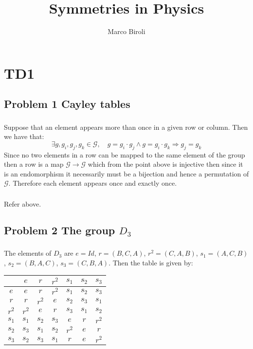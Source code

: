 \documentclass[10pt,a4paper]{book}
\title{Symmetries in Physics}
\author{Marco Biroli}
\begin{document}
\maketitle

\chapter{TD1}
\section{Problem 1 Cayley tables}
\subsection{}
Suppose that an element appears more than once in a given row or column. Then we have that:
\[
\exists g, g_i, g_j, g_k \in \mathcal{G}, \quad g = g_i \cdot g_j \land g = g_i \cdot g_k \Rightarrow g_j = g_k
\]
Since no two elements in a row can be mapped to the same element of the group then a row is a map $\mathcal{G} \to \mathcal{G}$ which from the point above is injective then since it is an endomorphism it necessarily must be a bijection and hence a permutation of $\mathcal{G}$. Therefore each element appears once and exactly once.

\subsection{}
Refer above.

\section{Problem 2 The group $D_3$}
\subsection{}
The elements of $D_3$ are $e = Id$, $r = (B, C, A)$, $r^2 = (C, A, B)$, $s_1 = (A, C, B)$, $s_2 = (B, A, C)$, $s_3 = (C, B, A)$. Then the table is given by:
\begin{center}
\begin{tabular}{ c | c | c | c | c | c | c }
 & $e$ & $r$ & $r^2$ & $s_1$ & $s_2$ & $s_3$\\
 \hline
 $e$ & $e$ & $r$ & $r^2$ & $s_1$ & $s_2$ & $s_3$ \\
 \hline
 $r$ & $r$ & $r^2$ & $e$ & $s_2$ & $s_3$ & $s_1$ \\
 \hline 
 $r^2$ & $r^2$ & $e$ & $r$ & $s_3$ & $s_1$ & $s_2$\\
 \hline
 $s_1$ & $s_1$ & $s_2$ & $s_3$ & $e$ & $r$ & $r^2$\\
 \hline
 $s_2$ & $s_3$ & $s_1$ & $s_2$ & $r^2$ & $e$ & $r$\\
 \hline 
 $s_3$ & $s_2$ & $s_3$ & $s_1$ & $r$ & $e$ & $r^2$
\end{tabular}
\end{center}
\end{document}
